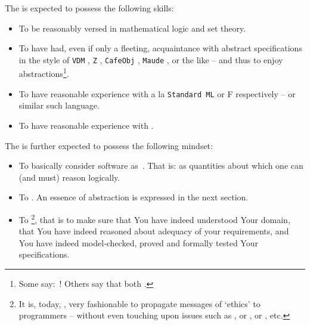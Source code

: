 \begynd
\pind The  is expected to possess the
      following skills:
\afslut
\begin{itemize}
\item To be reasonably versed in  mathematical logic
  and set theory.
\item To have had, even if only a  fleeting, acquaintance with abstract
  specifications in the style of
  \texttt{VDM} \citevdm,
  \texttt{Z} \citez,
  \texttt{CafeObj} \citecafeobj, 
  \texttt{Maude} \cite{maude-primer,maude-manual}, or the like -- and thus
  to enjoy abstractions\footnote{Some say: \,! Others say that both .}.
\item To have reasonable experience with  a
      la \texttt{Standard ML} or \textsf{F}
      \cite{MilnerTofte,Harper,MRHansen+HRischel} respectively
      \cite{Hansen+Rischel} -- or similar such language.
    \item To have  reasonable experience with 
      \cite{Hoa78,Hoare85,Hoare85+2004,Roscoe97,Schneider99}.
\end{itemize}
\noindent
\begynd
\pind The  is further expected to possess
      the following mindset:
\afslut
\begin{itemize}
\item To basically consider software as\ . That is: as quantities about which one can (and must) reason logically.
  \item To . An essence of
  abstraction is expressed in the next section.

\item To \footnote{It is, today, \todaytime, 
    very fashionable to propagate messages of `ethics' to programmers
    -- without even touching upon issues such as , or
    ,
    or , etc.}, that is to make sure that You have 
    indeed understood Your domain, that You  have indeed reasoned
    about adequacy of your requirements, and  You have indeed
    model-checked, proved and formally tested Your  
    specifications.
\end{itemize}

